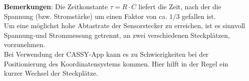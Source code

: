 \documentclass[../main.tex]{subfiles}
\begin{document}
\begin{tcolorbox}
    \vspace{0.4cm}
    \textbf{Bemerkungen}: Die Zeitkonstante $\tau=R \cdot C$ liefert die Zeit, nach der die Spannung (bzw. Stromstärke) um einen Faktor von ca. $1/3$ gefallen ist. \\
    Um eine möglichst hohe Abtastrate der Sensorstecker zu erreichen, ist es sinnvoll Spannung-und Strommessung getrennt, an zwei verschiedenen Steckplätzen, vorzunehmen.\\
Bei Verwendung der CASSY-App kann es zu Schwierigkeiten bei der Positionierung des Koordinatensystems kommen. Hier hilft in der Regel ein kurzer Wechsel der Steckplätze.
\end{tcolorbox}
\end{document}
